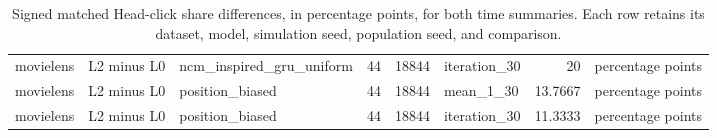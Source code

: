 \begin{table}[htbp!]
\begin{tabular}{lllrrlrl}
movielens & L2 minus L0 & ncm\_inspired\_gru\_uniform & 44 & 18844 & iteration\_30 & 20 & percentage points \\
movielens & L2 minus L0 & position\_biased & 44 & 18844 & mean\_1\_30 & 13.7667 & percentage points \\
movielens & L2 minus L0 & position\_biased & 44 & 18844 & iteration\_30 & 11.3333 & percentage points \\
\hline
\end{tabular}
\caption{Signed matched Head-click share differences, in percentage points, for both time summaries. Each row retains its dataset, model, simulation seed, population seed, and comparison.}
\label{chap:results:tab:rq6_cross_dataset_head_click_effects}
\end{table}
